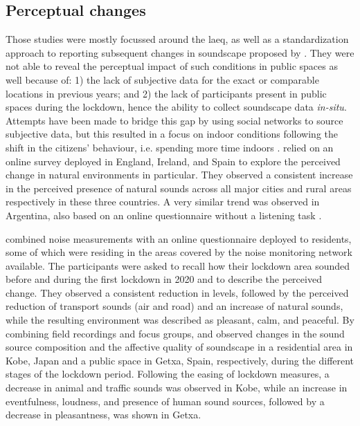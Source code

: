 \subsection{Perceptual changes}

 Those studies were mostly focussed around the \gls{laeq}, as well as a standardization approach to reporting subsequent changes in soundscape proposed by \citet{Asensio2020Taxonomy}. They were not able to reveal the perceptual impact of such conditions in public spaces as well because of: 1) the lack of subjective data for the exact or comparable locations in previous years; and 2) the lack of participants present in public spaces during the lockdown, hence the ability to collect soundscape data \emph{in-situ}. Attempts have been made to bridge this gap by using social networks to source subjective data, but this resulted in a focus on indoor conditions following the shift in the citizens' behaviour, i.e. spending more time indoors \citep{Bartalucci2021survey,Lee2021Attitudes}. \citet{GarridoCumbrera2021Perceptions} relied on an online survey deployed in England, Ireland, and Spain to explore the perceived change in natural environments in particular. They observed a consistent increase in the perceived presence of natural sounds across all major cities and rural areas respectively in these three countries. A very similar trend was observed in Argentina, also based on an online questionnaire without a listening task \citep{Maggi2021Perception}. 
 
 \citet{Munoz2020Lockdown} combined noise measurements with an online questionnaire deployed to residents, some of which were residing in the areas covered by the noise monitoring network available. The participants were asked to recall how their lockdown area sounded before and during the first lockdown in 2020 and to describe the perceived change. They observed a consistent reduction in levels, followed by the perceived reduction of transport sounds (air and road) and an increase of natural sounds, while the resulting environment was described as pleasant, calm, and peaceful. By combining field recordings and focus groups, \citet{Sakagami2020How} and \citet{Lenzi2021Soundscape} observed changes in the sound source composition and the affective quality of soundscape in a residential area in Kobe, Japan and a public space in Getxa, Spain, respectively, during the different stages of the lockdown period. Following the easing of lockdown measures, a decrease in animal and traffic sounds was observed in Kobe, while an increase in eventfulness, loudness, and presence of human sound sources, followed by a decrease in pleasantness, was shown in Getxa.

